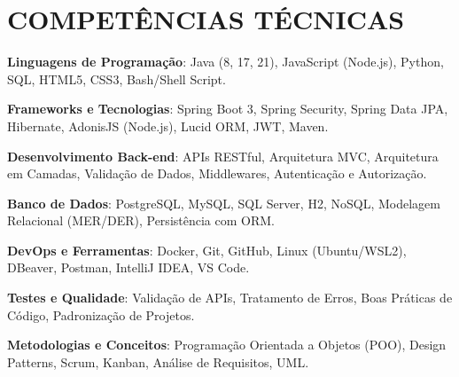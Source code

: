 \documentclass[letterpaper,11pt]{article}
\begin{document}
\section{COMPETÊNCIAS TÉCNICAS}
 \begin{itemize}[leftmargin=0.15in, label={}]
    \small{\item{
     \textbf{Linguagens de Programação}{: Java (8, 17, 21), JavaScript (Node.js), Python, SQL, HTML5, CSS3, Bash/Shell Script.} \\
     \vspace{2pt}
     
     \textbf{Frameworks e Tecnologias}{: Spring Boot 3, Spring Security, Spring Data JPA, Hibernate, AdonisJS (Node.js), Lucid ORM, JWT, Maven.} \\
     \vspace{2pt}
     
     \textbf{Desenvolvimento Back-end}{: APIs RESTful, Arquitetura MVC, Arquitetura em Camadas, Validação de Dados, Middlewares, Autenticação e Autorização.} \\
     \vspace{2pt}
     
     \textbf{Banco de Dados}{: PostgreSQL, MySQL, SQL Server, H2, NoSQL, Modelagem Relacional (MER/DER), Persistência com ORM.} \\
     \vspace{2pt}
     
     \textbf{DevOps e Ferramentas}{: Docker, Git, GitHub, Linux (Ubuntu/WSL2), DBeaver, Postman, IntelliJ IDEA, VS Code.} \\
     \vspace{2pt}
     
     \textbf{Testes e Qualidade}{: Validação de APIs, Tratamento de Erros, Boas Práticas de Código, Padronização de Projetos.} \\
     \vspace{2pt}
     
     \textbf{Metodologias e Conceitos}{: Programação Orientada a Objetos (POO), Design Patterns, Scrum, Kanban, Análise de Requisitos, UML.}
    }}
 \end{itemize}


\end{document}
